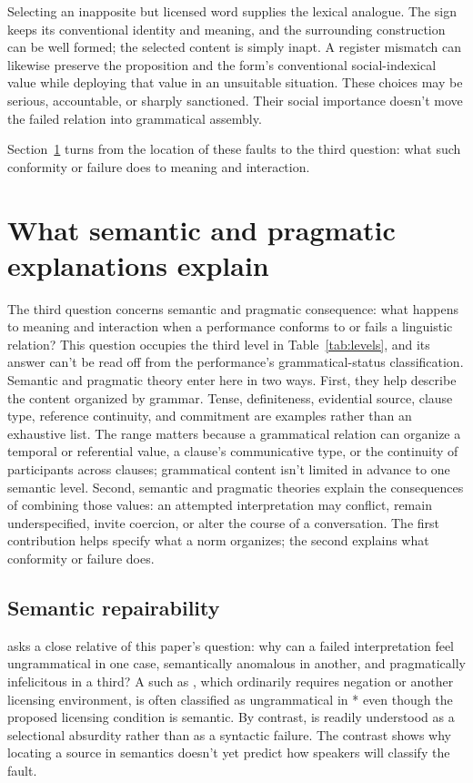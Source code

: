\documentclass[12pt,letterpaper]{article}
\begin{document}
Selecting an inapposite but licensed word supplies the lexical analogue. The sign keeps
its conventional identity and meaning, and the surrounding construction can be
well formed; the selected content is simply inapt. A register mismatch can
likewise preserve the proposition and the form's conventional social-indexical
value while deploying that value in an unsuitable situation. These choices may be
serious, accountable, or sharply sanctioned. Their social importance doesn't
move the failed relation into grammatical assembly.

Section~\ref{sec:semantics} turns from the location of these faults to the third
question: what such conformity or failure does to meaning and interaction.


\section{What semantic and pragmatic explanations explain}
\label{sec:semantics}

The third question concerns semantic and pragmatic consequence: what happens to
meaning and interaction when a performance conforms to or fails a linguistic
relation? This question occupies the third level in Table~\ref{tab:levels}, and its answer can't be read
off from the performance's grammatical-status classification. Semantic and
pragmatic theory enter here in two ways. First, they help
describe the content organized by grammar. Tense, definiteness, evidential source,
clause type, reference continuity, and commitment are examples rather than an
exhaustive list. The range matters because a grammatical relation can organize a
temporal or referential value, a clause's communicative type, or the continuity of
participants across clauses; grammatical content isn't limited in advance to one
semantic level. Second, semantic and pragmatic theories explain the consequences
of combining those values:
an attempted interpretation may conflict, remain underspecified, invite coercion,
or alter the course of a conversation. The first contribution helps specify what
a norm organizes; the second explains what conformity or failure does.

\subsection{Semantic repairability}
\label{sec:repairability}

\textcite[329--334, 344--350]{abrusan2019} asks a close relative of this paper's
question: why can a failed interpretation feel ungrammatical in one case,
semantically anomalous in another, and pragmatically infelicitous in a third? A
 such as , which ordinarily requires
negation or another licensing environment, is often classified as ungrammatical
in * even though the proposed licensing condition is
semantic. By
contrast,  is readily understood as a
selectional absurdity rather than as a syntactic failure. The contrast shows why
locating a source in semantics doesn't yet predict how speakers will classify the
fault.
\end{document}

